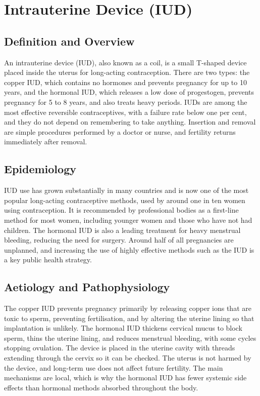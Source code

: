 \chapter{Intrauterine Device (IUD)}

\section*{Definition and Overview}
An intrauterine device (IUD), also known as a coil, is a small T-shaped device placed inside the uterus for long-acting contraception. There are two types: the copper IUD, which contains no hormones and prevents pregnancy for up to 10 years, and the hormonal IUD, which releases a low dose of progestogen, prevents pregnancy for 5 to 8 years, and also treats heavy periods. IUDs are among the most effective reversible contraceptives, with a failure rate below one per cent, and they do not depend on remembering to take anything. Insertion and removal are simple procedures performed by a doctor or nurse, and fertility returns immediately after removal.

\section*{Epidemiology}
IUD use has grown substantially in many countries and is now one of the most popular long-acting contraceptive methods, used by around one in ten women using contraception. It is recommended by professional bodies as a first-line method for most women, including younger women and those who have not had children. The hormonal IUD is also a leading treatment for heavy menstrual bleeding, reducing the need for surgery. Around half of all pregnancies are unplanned, and increasing the use of highly effective methods such as the IUD is a key public health strategy.

\section*{Aetiology and Pathophysiology}
The copper IUD prevents pregnancy primarily by releasing copper ions that are toxic to sperm, preventing fertilisation, and by altering the uterine lining so that implantation is unlikely. The hormonal IUD thickens cervical mucus to block sperm, thins the uterine lining, and reduces menstrual bleeding, with some cycles stopping ovulation. The device is placed in the uterine cavity with threads extending through the cervix so it can be checked. The uterus is not harmed by the device, and long-term use does not affect future fertility. The main mechanisms are local, which is why the hormonal IUD has fewer systemic side effects than hormonal methods absorbed throughout the body.

